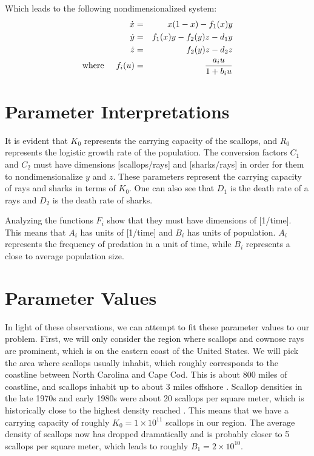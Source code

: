 \documentclass[%
        final,
        notitlepage,
        narroweqnarray,
        inline,
        ]{ieee}
\begin{document}
Which leads to the following nondimensionalized system:
\begin{eqnarray}
\dot{x} &=& x(1-x) - f_1(x) y \nonumber \\
\dot{y} &=& f_1(x) y - f_2(y) z - d_1 y \\
\dot{z} &=& f_2(y) z - d_2 z \nonumber \\
\mathrm{where} \hspace{0.5cm} f_i(u) &=& \frac{a_i u}{1 + b_i u} \nonumber
\end{eqnarray}

\section{Parameter Interpretations}

It is evident that $K_0$ represents the carrying capacity of the scallops, and $R_0$ represents the logistic growth rate of the population. The conversion factors $C_1$ and $C_2$ must have dimensions [scallops/rays] and [sharks/rays] in order for them to nondimensionalize $y$ and $z$. These parameters represent the carrying capacity of rays and sharks in terms of $K_0$. One can also see that $D_1$ is the death rate of a rays and $D_2$ is the death rate of sharks. 

Analyzing the functions $F_i$ show that they must have dimensions of [1/time]. This means that $A_i$ has units of [1/time] and $B_i$ has units of population. $A_i$ represents the frequency of predation in a unit of time, while $B_i$ represents a close to average population size. 

\section{Parameter Values}

In light of these observations, we can attempt to fit these parameter values to our problem. First, we will only consider the region where scallops and cownose rays are prominent, which is on the eastern coast of the United States. We will pick the area where scallops usually inhabit, which roughly corresponds to the coastline between North Carolina and Cape Cod. This is about 800 miles of coastline, and scallops inhabit up to about 3 miles offshore \cite{Fay(1983)}. Scallop densities in the late 1970s and early 1980s were about 20 scallops per square meter, which is historically close to the highest density reached \cite{Fay(1983)}. This means that we have a carrying capacity of roughly $K_0 = 1 \times 10^{11}$ scallops in our region. The average density of scallops now has dropped dramatically and is probably closer to 5 scallops per square meter, which leads to roughly $B_1 = 2 \times 10^{10}$. 
\end{document}

